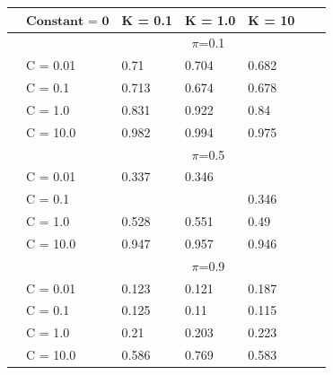 \documentclass[english]{report}
\begin{document}
\begin{table}[H]
    \centering
    
    \begin{tabular}{ll|lllll}
        \hline
                                &  $\textbf{Constant = 0}$       & K = 0.1 & K = 1.0 & K = 10 \\ \hline
                                & & \multicolumn{3}{c}{$\pi$=0.1} \\ \hline
                                & C = 0.01   & 0.71 & 0.704 & 0.682    \\
                                & C = 0.1    & 0.713 & 0.674 & 0.678  \\
                                & C = 1.0    & 0.831 & 0.922 & 0.84    \\
                                & C = 10.0   & 0.982 & 0.994 & 0.975  \\ \hline

                                & & \multicolumn{3}{c}{$\pi$=0.5} \\ \hline
                                & C = 0.01   & 0.337 & 0.346 & \color{red}{0.342}   \\
                                & C = 0.1    & \color{red}{0.324} & \color{red}{0.344} & 0.346  \\
                                & C = 1.0    & 0.528 & 0.551 & 0.49    \\
                                & C = 10.0   & 0.947 & 0.957 & 0.946  \\ \hline

                                & & \multicolumn{3}{c}{$\pi$=0.9} \\ \hline
                                & C = 0.01   & 0.123 & 0.121 & 0.187  \\
                                & C = 0.1    & 0.125 & 0.11 & 0.115  \\
                                & C = 1.0    & 0.21 & 0.203 & 0.223    \\
                                & C = 10.0   & 0.586 & 0.769 & 0.583  \\ 
    \hline
    \end{tabular}
\end{table}
\end{document}
